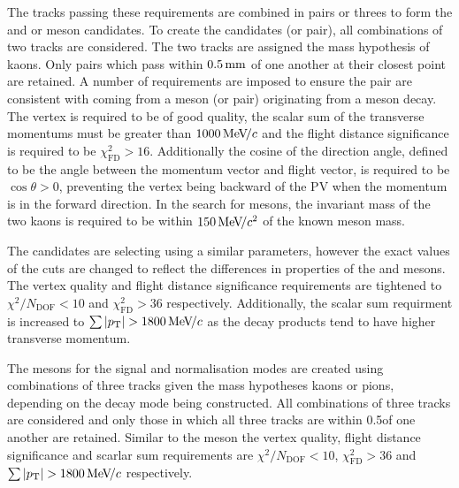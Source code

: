 
The tracks passing these requirements are combined in pairs or threes to form the \Dsp and \phiz or \Dzb meson candidates.  
To create the \phiz candidates (or \Kp\Km pair), all combinations of two tracks are considered. The two tracks are assigned the mass hypothesis of kaons. Only pairs which pass within $0.5\mathrm{ \,mm}$ of one another at their closest point are retained. A number of requirements are imposed to ensure the pair are consistent with coming from a \phiz meson (or \Kp\Km pair) originating from a \Bp meson decay. The vertex is required to be of good quality, the scalar sum of the transverse momentums must be greater than $1000{\mathrm{\,Me\kern -0.1em V\!/}c}$ and the flight distance significance is required to be $\chi^{2}_{\text{FD} } > 16$. Additionally the cosine of the direction angle, defined to be the angle between the momentum vector and flight vector, is required to be $\cos{\theta}>0$, preventing the vertex being backward of the PV when the momentum is in the forward direction. In the search for \decay{\Bp}{\Dsp\phiz} mesons, the invariant mass of the two kaons is required to be within $150{\mathrm{\,Me\kern -0.1em V\!/}c^2}$ of the known \phiz meson mass.  

The \Dzb candidates are selecting using a similar parameters, however the exact values of the cuts are changed to reflect the differences in properties of the \phiz and \Dzb mesons. The vertex quality and flight distance significance requirements are tightened to $\chi^{2}/N_{\text{DOF}} < 10$ and $\chi^{2}_{\text{FD} }  > 36$ respectively. Additionally, the scalar \pt sum requirment is increased to $\sum{|\pt|} > 1800 \mevc$ as the decay products tend to have higher transverse momentum. 


The \Dsp mesons for the signal and normalisation modes are created using combinations of three tracks given the mass hypotheses kaons or pions, depending on the decay mode being constructed. All combinations of three tracks are considered and only those in which all three tracks are within 0.5\mm of one another are retained. Similar to the \Dzb meson the vertex quality, flight distance significance and scarlar \pt sum requirements are $\chi^{2}/N_{\text{DOF}} < 10$, $\chi^{2}_{\text{FD} }  > 36$ and $\sum{|\pt|} > 1800 \mevc$ respectively.



